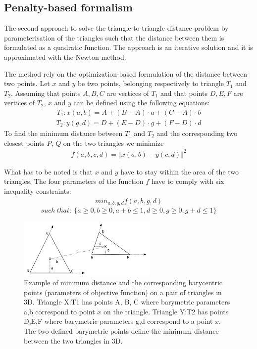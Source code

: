 \subsection{Penalty-based formalism}

The second approach to solve the triangle-to-triangle  distance problem by parameterisation of the triangles such that the distance between them is formulated as a quadratic function. The approach is an iterative solution and it is approximated with the Newton method.

The method rely on the optimization-based formulation of the distance between two points. Let $x$ and $y$ be two points, belonging respectively to triangle $T_1$ and $T_2$. Assuming that points $A, B, C$ are vertices of $T_1$ and that points $D, E, F$ are vertices of $T_2$, $x$ and $y$ can be defined using the following equations: 
\begin{align*}
T_{1}:x(a,b)=A+(B-A) \cdot a+(C-A)\cdot b
\end{align*}
\begin{align*}
T_{2}:y(g,d)=D+(E-D) \cdot g+(F-D) \cdot d
\end{align*} 
To find the minimum distance between $T_1$ and $T_2$ and the corresponding two closest points $P$, $Q$ on the two triangles we minimize
\begin{align*}
f\left(a,b,c,d\right)=\left\Vert x\left(a,b\right)-y\left(c,d\right)\right\Vert ^{2}
\end{align*} 

What has to be noted is that $x$ and $y$ have to stay within the area of the two triangles. The four parameters of the function $f$ have to comply with six inequality constraints:
\begin{align*}
min_{a,b,g,d} f(a,b,g,d)
\end{align*}  
$$such \:that: \: \{a\geq0,b\geq0, a+b\leq1, d\geq0, g\geq0, g+d\leq1 \}$$ 


\begin{figure}[htb]
  \begin{center}
    \includegraphics[width=0.6\textwidth]{sketches/c.png}
  \end{center}
  \caption{
    Example of minimum distance and the corresponding barycentric points (parameters of objective function) on a pair of triangles in 3D. Triangle X:T1 has points A, B, C where barymetric parameters a,b correspond to point $x$ on the triangle. Triangle Y:T2 has points D,E,F where barymetric parameters g,d correspond to a point $x$. The two defined barymetric points define the minimum distance between the two triangles in 3D.
  }
  \label{figure:barycentric_contact}
\end{figure}

